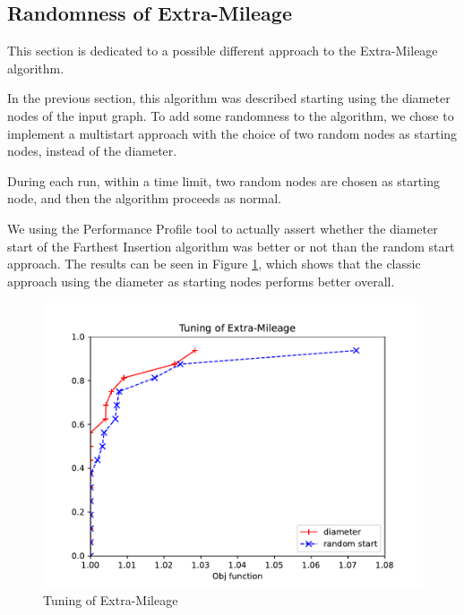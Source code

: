 \subsection{Randomness of Extra-Mileage}
This section is dedicated to a possible different approach to the Extra-Mileage algorithm. 

In the previous section, this algorithm was described starting using the diameter nodes of the input graph. To add some randomness to the algorithm, we chose to implement a multistart approach with the choice of two random nodes as starting nodes, instead of the diameter.

During each run, within a time limit, two random nodes are chosen as starting node, and then the algorithm proceeds as normal. 

We using the Performance Profile tool to actually assert whether the diameter start of the Farthest Insertion algorithm was better or not than the random start approach. The results can be seen in Figure \ref{fig:extra}, which shows that the classic approach using the diameter as starting nodes performs better overall.

\begin{figure}[!h]
    \centering
    \includegraphics[width=\textwidth]{images/extra.pdf}
    \caption{Tuning of Extra-Mileage}
    \label{fig:extra}
\end{figure}
